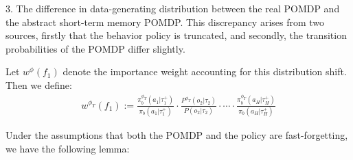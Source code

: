 \documentclass[twoside]{article}
\begin{document}
3. The difference in data-generating distribution between the real POMDP and the abstract short-term memory POMDP.
This discrepancy arises from two sources, firstly that the behavior policy is truncated, and secondly, the transition probabilities of the POMDP differ slightly.

Let $w^{\phi}(f_1)$ denote the importance weight accounting for this distribution shift. Then we define:
\begin{align}
w^{\phi_T}(f_1):=\frac{\pi_b^{\phi_T}(a_1|\tau_1^+)}{\pi_b(a_1|\tau_1^+)}\cdot\frac{P^{\phi_T}(o_2|\tau_2)}{P(o_2|\tau_2)}\cdot\cdots\cdot\frac{\pi_b^{\phi_T}(a_H|\tau_H^+)}{\pi_b(a_H|\tau_H^+)}
\end{align}

Under the assumptions that both the POMDP and the policy are fast-forgetting, we have the following lemma:
\end{document}
